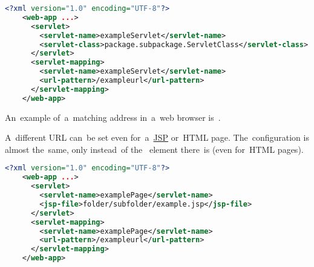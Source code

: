\begin{lstlisting}[language=XML]
    <?xml version="1.0" encoding="UTF-8"?>
    <web-app ...>
      <servlet>
        <servlet-name>exampleServlet</servlet-name>
        <servlet-class>package.subpackage.ServletClass</servlet-class>
      </servlet>
      <servlet-mapping>
        <servlet-name>exampleServlet</servlet-name>
        <url-pattern>/exampleurl</url-pattern>
      </servlet-mapping>
    </web-app>
\end{lstlisting}

\noindent An~example of~a~matching address in~a~web browser is~.

A~different URL can~be set even for~a~\hyperref[jsp]{JSP} or~HTML page. The~configuration is almost the~same, only instead~of the~ element there~is  (even for~HTML pages).

\begin{lstlisting}[language=XML]
    <?xml version="1.0" encoding="UTF-8"?>
    <web-app ...>
      <servlet>
        <servlet-name>examplePage</servlet-name>
        <jsp-file>folder/subfolder/example.jsp</jsp-file>
      </servlet>
      <servlet-mapping>
        <servlet-name>examplePage</servlet-name>
        <url-pattern>/exampleurl</url-pattern>
      </servlet-mapping>
    </web-app>
\end{lstlisting}
